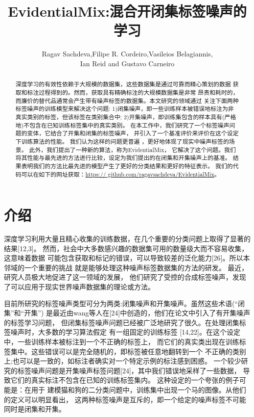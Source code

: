 \documentclass[11pt]{article}
\title{EvidentialMix:混合开闭集标签噪声的学习}
\author{Ragav Sachdeva,Filipe R. Cordeiro,Vasileios Belagiannis,\\ Ian Reid and Gustavo Carneiro}{}
\date{}
\begin{document}
\maketitle
\begin{abstract}
深度学习的有效性依赖于大规模的数据集，这些数据集是通过可靠而精心策划的数据
获取和标注过程得到的。然而，获取具有精确标注的大规模数据集是非常
昂贵和耗时的，而廉价的替代品通常会产生带有噪声标签的数据集。本文研究的领域通过
关注下面两种标签噪声的训练模型来解决这个问题:
1)闭集噪声，即一些训练样本被错误地标注为非真实类别的标签，但该标签在类别集合中;
2)开集噪声，即训练集包含的样本具有(严格地)不包含在已知训练标签集中的真实类别。
在本工作中，我们研究了一个标签噪声问题的变体，它结合了开集和闭集的标签噪声，
并引入了一个基准评价来评价在这个设定下训练算法的性能。
我们认为这样的问题更普遍 ，更好地体现了现实中噪声标签的场景。
此外，我们提出了一种新的算法，称为EvidentialMix， 
它解决了这个问题。我们将其性能与最先进的方法进行比较，设定为我们提出的在闭集和开集噪声上的基准。
结果表明我们的方法比最先进的模型产生了更好的分类结果和更好的特征表示。
我们的代码可以在如下的网址获取：\url{https:// github.com/ragavsachdeva/EvidentialMix}。
\end{abstract}
\newpage
\section{介绍}
深度学习利用大量且精心收集的训练数据，在几个重要的分类问题上取得了显著的结果[12,3]。
然而，社会中大多数感兴趣的数据集可用的数量级大而不容易收集，这意味着数据
可能包含获取和标记的错误，可以导致较差的泛化能力[26]。所以本邻域的一个重要的挑战
就是能够处理这种噪声标签数据集的方法的研发。 最近，研究人员极大地促进了这一领域的发展，
他们研究了受控的合成标签噪声，发现了可以应用于现实世界噪声数据集的理论或方法。

目前所研究的标签噪声类型可分为两类:闭集噪声和开集噪声。虽然这些术语(“闭集”和“开集”) 
是最近由wang等人在[24]中创造的，他们在论文中引入了有开集噪声的标签学习问题，
但闭集标签噪声问题已经被广泛地研究了很久。在处理闭集标签噪声时，大多数的学习算法假定
有一组固定的训练标签 [14,22]。在这个设定中，一些训练样本被标注到一个不正确的标签上，
而它们的真实类出现在训练标签集中。这些错误可以是完全随机的，即标签被任意地翻转到一个
不正确的类别上;也可以是一致的，如标注者确实对一个特定示例的标注感到困惑。
一个较少研究的标签噪声问题是开集噪声标签问题[24]，其中我们错误地采样了一些数据，
导致它们的真实标注不包含在已知的训练标签集内。 这种设定的一个夸张的例子可能是：在用于
建模猫和狗的二分类问题中，训练集中出现一个马的图像。从他们的定义可以明显看出，
这两种标签噪声是互斥的，即一个给定的噪声标签不可能同时是闭集和开集。
\end{document}
